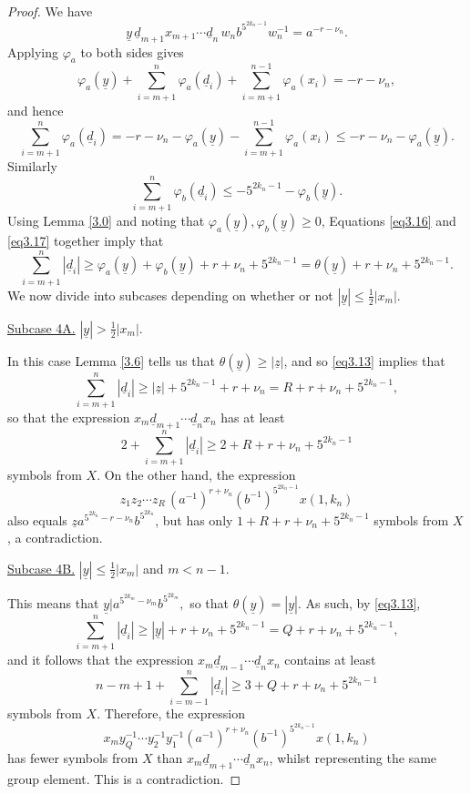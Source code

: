 \documentclass[10pt,a4paper]{amsart}
\newcommand{\pdt}{\underline}
\begin{document}
\begin{proof}
		We have
		$$\pdt{y} \, \pdt{d}_{m+1} x_{m+1} \cdots \pdt{d}_n  \, w_n b^{5^{2k_n-1}} w_n^{-1} = a^{-r - \nu_n}.$$
		Applying $\varphi_a$ to both sides gives
		$$\varphi_a(\pdt{y})  + \sum_{i=m+1}^n \varphi_a(\pdt{d}_i) + \sum_{i=m+1}^{n-1} \varphi_a(x_i)  = -r - \nu_n,$$
		and hence
		\begin{equation}		\label{eq3.16}
			\sum_{i=m+1}^n \varphi_a(\pdt{d}_i) = -r -\nu_n -\varphi_a(\pdt{y}) -\sum_{i=m+1}^{n-1} \varphi_a(x_i) \leq -r -\nu_n - \varphi_a(\pdt{y}). 
		\end{equation} 
		Similarly 
		\begin{equation}		\label{eq3.17}
			\sum_{i=m+1}^n \varphi_b(\pdt{d}_i) \leq -5^{2k_n-1} - \varphi_b(\pdt{y}).
		\end{equation}
		Using Lemma \ref{3.0} and noting that $\varphi_a(\pdt{y}), \varphi_b(\pdt{y}) \geq 0$, Equations \eqref{eq3.16} and \eqref{eq3.17} together imply that 
		\begin{equation}		\label{eq3.13}
			\sum_{i=m+1}^n |\pdt{d}_i| \geq \varphi_a(\pdt{y}) + \varphi_b(\pdt{y})  +r +\nu_n + 5^{2k_n-1} = \theta(\pdt{y})  +r +\nu_n + 5^{2k_n-1}.
		\end{equation}
		We now divide into subcases depending on whether or not $|\pdt{y}|\leq \frac{1}{2}|x_m|$.
		
		
		\vskip 2mm
		\noindent
		\underline{Subcase 4A.} $|\pdt{y}| > \frac{1}{2}|x_m|$.
		
		In this case Lemma \ref{3.6} tells us that $\theta(\pdt{y}) \geq |\pdt{z}|$, and so \eqref{eq3.13} implies that 
		$$\sum_{i=m+1}^n |\pdt{d}_i| \geq |\pdt{z}| + 5^{2k_n-1} + r +\nu_n = R  + r +\nu_n + 5^{2k_n-1} ,$$
		so that the expression $x_m \pdt{d}_{m+1} \cdots \pdt{d}_n x_n$ has at least 
		$$2 + \sum_{i=m+1}^n |\pdt{d}_i| \geq 2+ R + r +\nu_n + 5^{2k_n-1}$$
		symbols from $X$. 	
		On the other hand, the expression
		$$z_1 z_2 \cdots z_R \, (a^{-1})^{r+\nu_n} (b^{-1})^{5^{2k_n-1}} x(1, k_n)$$
		also equals $\pdt{z} a^{5^{2k_n}-r - \nu_n}b^{5^{2k_n}}$, but has only $1+ R + r +\nu_n + 5^{2k_n-1}$ symbols from $X$, a contradiction.
			
		\vskip 2mm
		\noindent
		\underline{Subcase 4B.} $|\pdt{y}| \leq \frac{1}{2}|x_m|$  and $m<n-1$.
		
		This means that $\pdt{y} | a^{5^{2k_m} - \nu_m} b^{5^{2k_m}},$ so that $\theta(\pdt{y}) = |\pdt{y}|$. As such, by \eqref{eq3.13},
		$$ \sum_{i=m+1}^n |\pdt{d}_i| \geq |\pdt{y}| + r + \nu_n + 5^{2k_n-1} = Q + r + \nu_n + 5^{2k_n-1}  ,$$
		and it follows that the expression $x_m \pdt{d}_{m-1} \cdots \pdt{d}_n x_n$ contains at least 
		$$n-m + 1 + \sum_{i = m-1}^n|\pdt{d}_i| \geq  3 + Q + r + \nu_n + 5^{2k_n-1}$$
		symbols from $X$.
		Therefore, the expression
		$$x_m y_Q^{-1} \cdots y_2^{-1} y_1^{-1}(a^{-1})^{r + \nu_n} (b^{-1})^{5^{2k_n-1}} x(1, k_n)$$
		has fewer symbols from $X$ than $x_m \pdt{d}_{m+1} \cdots \pdt{d}_n x_n$, whilst representing the same group element. This is a contradiction. 
		

\end{proof}
\end{document}

